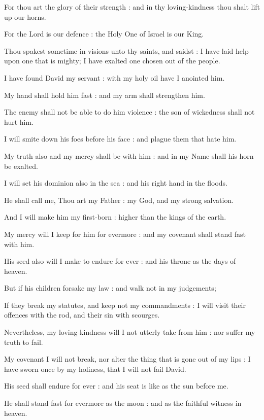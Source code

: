 For thou art the glory of their strength : and in thy loving-kindness thou shalt lift up our horns.\par
{}For the Lord is our defence : the Holy One of Israel is our King.\par
{}Thou spakest sometime in visions unto thy saints, and saidst : I have laid help upon one that is mighty; I have exalted one chosen out of the people.\par
{}I have found David my servant : with my holy oil have I anointed him.\par
{}My hand shall hold him fast : and my arm shall strengthen him.\par
{}The enemy shall not be able to do him violence : the son of wickedness shall not hurt him.\par
{}I will smite down his foes before his face : and plague them that hate him.\par
{}My truth also and my mercy shall be with him : and in my Name shall his horn be exalted.\par
{}I will set his dominion also in the sea : and his right hand in the floods.\par
{}He shall call me, Thou art my Father : my God, and my strong salvation.\par
{}And I will make him my first-born : higher than the kings of the earth.\par
{}My mercy will I keep for him for evermore : and my covenant shall stand fast with him.\par
{}His seed also will I make to endure for ever : and his throne as the days of heaven.\par
{}But if his children forsake my law : and walk not in my judgements;\par
{}If they break my statutes, and keep not my commandments : I will visit their offences with the rod, and their sin with scourges.\par
{}Nevertheless, my loving-kindness will I not utterly take from him : nor suffer my truth to fail.\par
{}My covenant I will not break, nor alter the thing that is gone out of my lips : I have sworn once by my holiness, that I will not fail David.\par
{}His seed shall endure for ever : and his seat is like as the sun before me.\par
{}He shall stand fast for evermore as the moon : and as the faithful witness in heaven.\par
